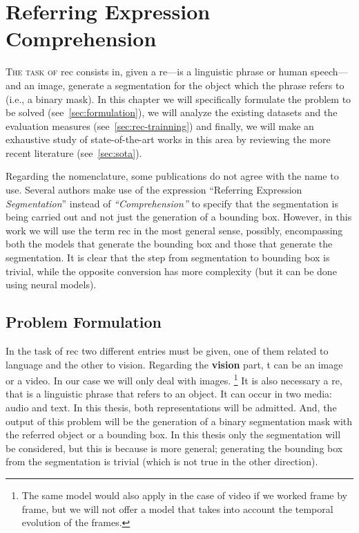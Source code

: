 

\chapter{Referring Expression Comprehension}%
\label{cha:rec}



\lettrine{T}{he task of} \gls{rec} consists in, given a \gls{re}---is a
linguistic phrase or human speech---and an image, generate a segmentation for
the object which the phrase refers to (i.e., a binary mask). In this chapter we
will specifically formulate the problem to be solved (see\
\vref{sec:formulation}), we will analyze the existing datasets and the
evaluation measures (see\ \vref{sec:rec-trainning}) and finally, we will make
an exhaustive study of state-of-the-art works in this area by reviewing the
more recent literature (see\ \vref{sec:sota}).

Regarding the nomenclature, some publications do not agree with the name to
use. Several authors make use of the expression ``Referring Expression
\textit{Segmentation}'' instead of \textit{``Comprehension''} to specify that
the segmentation is being carried out and not just the generation of a bounding
box. However, in this work we will use the term \gls{rec} in the most general
sense, possibly, encompassing both the models that generate the bounding box
and those that generate the segmentation. It is clear that the step from
segmentation to bounding box is trivial, while the opposite conversion has more
complexity (but it can be done using neural models).



\section{Problem Formulation}\label{sec:formulation}

In the task of \gls{rec} two different entries must be given, one of them
related to language and the other to vision. Regarding the \textbf{vision}
part, t can be an image or a video. In our case we will only deal with images.%
\footnote{The same model would also apply in the case of video if we worked
  frame by frame, but we will not offer a model that takes into account the
  temporal evolution of the frames.} It is also necessary a
\gls{re}, that is a linguistic phrase that refers
to an object. It can occur in two media: audio and text. In this thesis, both
representations will be admitted. And, the output of this problem will be the
generation of a binary segmentation mask with the referred object or a bounding
box\index{Bounding box}. In this thesis only the segmentation will be
considered, but this is because is more general; generating the bounding box
from the segmentation is trivial (which is not true in the other direction).

